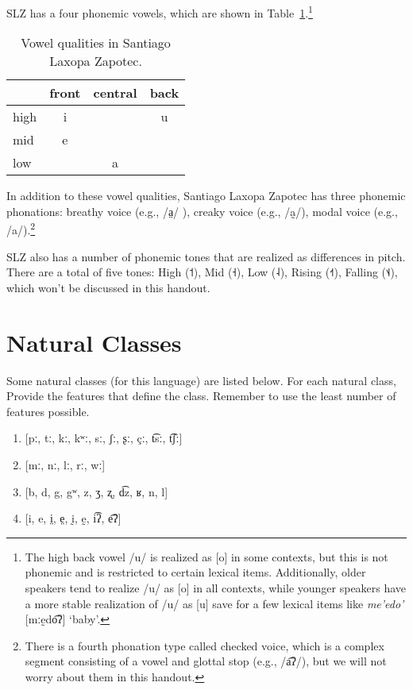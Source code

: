 \documentclass[12pt, letterpaper]{article}
\providecommand{\lsptoprule}{\midrule\toprule}
\providecommand{\lspbottomrule}{\bottomrule\midrule}
\begin{document}
SLZ has a four phonemic vowels, which are shown in Table~\ref{tab:SLZ_vowel_chart}.\footnote{The high back vowel /u/ is realized as [o] in some contexts, but this is not phonemic and is restricted to certain lexical items. Additionally, older speakers tend to realize /u/ as [o] in all contexts, while younger speakers have a more stable realization of /u/ as [u] save for a few lexical items like \textit{me'edo'} [mːḛdo͡ʔ] `baby'.} 

\begin{table}[h!]
    \centering
    \caption{Vowel qualities in Santiago Laxopa Zapotec.}
    \label{tab:SLZ_vowel_chart}
    \begin{tabular}{lccc}
        \lsptoprule
        &  front& central  & back \\
        \midrule 
        high   	&  i  &     &   u \\
        mid    	&  e  &   	& 	\\
        low   	&     &  a 	&	  \\
        \lspbottomrule
    \end{tabular}
\end{table}

In addition to these vowel qualities, Santiago Laxopa Zapotec has three phonemic phonations: breathy voice (e.g., /a̤/ ), creaky voice (e.g., /a̰/), modal voice (e.g., /a/).\footnote{There is a fourth phonation type called checked voice, which is a complex segment consisting of a vowel and glottal stop (e.g., /a͡ʔ/), but we will not worry about them in this handout.} 

SLZ also has a number of phonemic tones that are realized as differences in pitch. There are a total of five tones: High (˦), Mid (˧), Low (˨), Rising (˧˦), Falling (˦˨), which won't be discussed in this handout. 

\section{Natural Classes} 

Some natural classes (for this language) are listed below. For each natural class, Provide the features that define the class. Remember to use the least number of features possible.

\begin{enumerate}
	\item {}[pː, tː, kː, kʷː, sː, ʃː, ʂː, çː, t͡sː, t͡ʃː]
	\item {}[mː, nː, lː, rː, wː]
	\item {}[b, d, g, gʷ, z, ʒ, ʐ, d͡z, ʁ, n, l]
	\item {}[i, e, i̤, e̤, ḭ, ḛ, i͡ʔ, e͡ʔ]
\end{enumerate}
\end{document}
